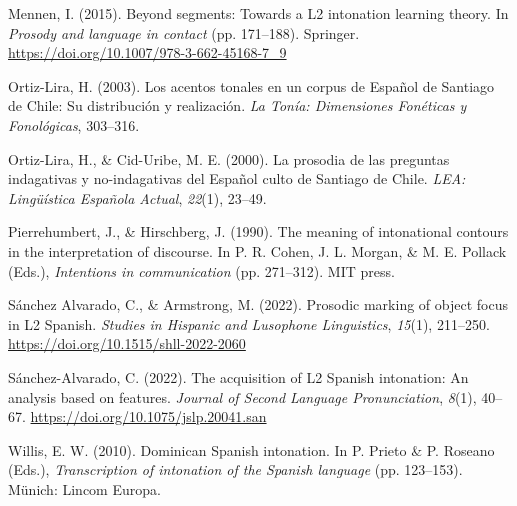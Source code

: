 \documentclass[]{article}
\newlength{\cslhangindent}
\newenvironment{CSLReferences}[2] %
 {%
  \setlength{\parindent}{0pt}
  \ifodd #1 \everypar{\setlength{\hangindent}{\cslhangindent}}\ignorespaces\fi
  \ifnum #2 > 0
  \setlength{\parskip}{#2\baselineskip}
  \fi
 }%
 {}
\begin{document}
\begin{CSLReferences}{1}{0}
\leavevmode{}%
Mennen, I. (2015). Beyond segments: {T}owards a {L}2 intonation learning theory. In \emph{Prosody and language in contact} (pp. 171--188). Springer. \url{https://doi.org/10.1007/978-3-662-45168-7_9}

\leavevmode{}%
Ortiz-Lira, H. (2003). Los acentos tonales en un corpus de {E}spañol de {Santiago de Chile}: Su distribución y realización. \emph{La Tonía: Dimensiones Fonéticas y Fonológicas}, 303--316.

\leavevmode{}%
Ortiz-Lira, H., \& Cid-Uribe, M. E. (2000). La prosodia de las preguntas indagativas y no-indagativas del {E}spañol culto de {S}antiago de {C}hile. \emph{LEA: Lingüística {E}spañola {A}ctual}, \emph{22}(1), 23--49.

\leavevmode{}%
Pierrehumbert, J., \& Hirschberg, J. (1990). The meaning of intonational contours in the interpretation of discourse. In P. R. Cohen, J. L. Morgan, \& M. E. Pollack (Eds.), \emph{Intentions in communication} (pp. 271--312). {MIT} press.

\leavevmode{}%
Sánchez Alvarado, C., \& Armstrong, M. (2022). Prosodic marking of object focus in {L}2 {S}panish. \emph{Studies in Hispanic and Lusophone Linguistics}, \emph{15}(1), 211--250. \url{https://doi.org/10.1515/shll-2022-2060}

\leavevmode{}%
Sánchez-Alvarado, C. (2022). The acquisition of {L}2 {S}panish intonation: {A}n analysis based on features. \emph{Journal of Second Language Pronunciation}, \emph{8}(1), 40--67. \url{https://doi.org/10.1075/jslp.20041.san}

\leavevmode{}%
Willis, E. W. (2010). {D}ominican {S}panish intonation. In P. Prieto \& P. Roseano (Eds.), \emph{Transcription of intonation of the {S}panish language} (pp. 123--153). Münich: Lincom Europa.

\end{CSLReferences}
\end{document}

